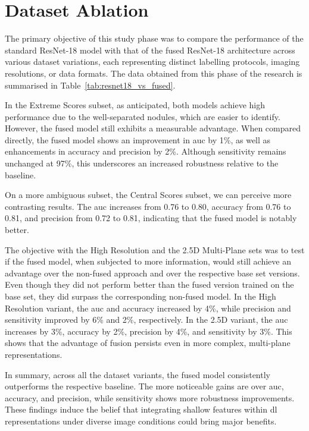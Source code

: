 \FloatBarrier

\section{Dataset Ablation}

The primary objective of this study phase was to compare the performance of the standard ResNet-18 model with that of the fused ResNet-18 architecture across various dataset variations, each representing distinct labelling protocols, imaging resolutions, or data formats. The data obtained from this phase of the research is summarised in Table~\ref{tab:resnet18_vs_fused}.

In the Extreme Scores subset, as anticipated, both models achieve high performance due to the well-separated nodules, which are easier to identify. However, the fused model still exhibits a measurable advantage. When compared directly, the fused model shows an improvement in \ac{auc} by 1\%, as well as enhancements in accuracy and precision by 2\%. Although sensitivity remains unchanged at 97\%, this underscores an increased robustness relative to the baseline.

On a more ambiguous subset, the Central Scores subset, we can perceive more contrasting results. The \ac{auc} increases from 0.76 to 0.80, accuracy from 0.76 to 0.81, and precision from 0.72 to 0.81, indicating that the fused model is notably better.

The objective with the High Resolution and the 2.5D Multi-Plane sets was to test if the fused model, when subjected to more information, would still achieve an advantage over the non-fused approach and over the respective base set versions.
Even though they did not perform better than the fused version trained on the base set, they did surpass the corresponding non-fused model. In the High Resolution variant, the \ac{auc} and accuracy increased by 4\%, while precision and sensitivity improved by 6\% and 2\%, respectively. In the 2.5D variant, the \ac{auc} increases by 3\%, accuracy by 2\%, precision by 4\%, and sensitivity by 3\%. This shows that the advantage of fusion persists even in more complex, multi-plane representations.

In summary, across all the dataset variants, the fused model consistently outperforms the respective baseline. The more noticeable gains are over \ac{auc}, accuracy, and precision, while sensitivity shows more robustness improvements.
These findings induce the belief that integrating shallow features within \ac{dl} representations under diverse image conditions could bring major benefits.

